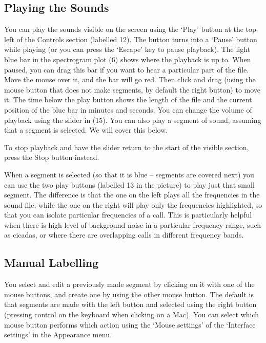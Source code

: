 \documentclass{article}
\begin{document}
\subsection{Playing the Sounds \label{sec:play}}

You can play the sounds visible on the screen using the `Play' button at the top-left of the Controls section (labelled 12). The button turns into a `Pause' button while playing (or you can press the `Escape' key to pause playback). The light blue bar in the spectrogram plot (6)  shows where the playback is up to. When paused, you can drag this bar if you want to hear a particular part of the file. Move the mouse over it, and the bar will go red. Then click and drag (using the mouse button that does not make segments, by default the right button) to move it. The time below the play button shows the length of the file and the current position of the blue bar in minutes and seconds. You can change the volume of playback using the slider in (15). You can also play a segment of sound, assuming that a segment is selected. We will cover this below.

To stop playback and have the slider return to the start of the visible section, press the Stop button instead.

When a segment is selected (so that it is blue -- segments are covered next) you can use the two play buttons (labelled 13 in the picture) to play just that small segment. The difference is that the one on the left plays all the frequencies in the sound file, while the one on the right will play only the frequencies highlighted, so that you can isolate particular frequencies of a call. This is particularly helpful when there is high level of background noise in a particular frequency range, such as cicadas, or where there are overlapping calls in different frequency bands.

\subsection{Manual Labelling}

You select and edit a previously made segment by clicking on it with one of the mouse buttons,  and create one by using the other mouse button. The default is that segments are made with the left button and selected using the right button (pressing control on the keyboard when clicking on a Mac). You can select which mouse button performs which action using the `Mouse settings' of the `Interface settings' in the Appearance menu. 
\end{document}
